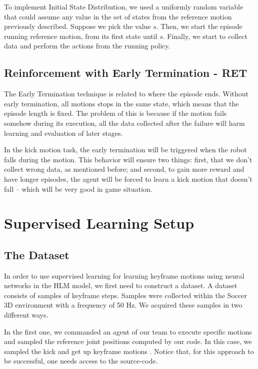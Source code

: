 To implement Initial State Distribution, we used a uniformly random variable that could assume any value in the set of states from the reference motion previously described. Suppose we pick the value $s$. Then, we start the episode running reference motion, from its first state until $s$. Finally, we start to collect data and perform the actions from the running policy.

\subsection{Reinforcement with Early Termination - RET}

The Early Termination technique is related to where the episode ends. Without early termination, all motions stops in the same state, which means that the episode length is fixed. The problem of this is because if the motion fails somehow during its execution, all the data collected after the failure will harm learning and evaluation of later stages.

In the kick motion task, the early termination will be triggered when the robot falls during the motion. This behavior will ensure two things: first, that we don't collect wrong data, as mentioned before; and second, to gain more reward and have longer episodes, the agent will be forced to learn a kick motion that doesn't fall -- which will be very good in game situation.



\section{Supervised Learning Setup}\label{supervised_learning_setup}
\subsection{The Dataset}\label{AA}
In order to use supervised learning for learning keyframe motions using neural networks in the HLM model, we first need to construct a dataset. A dataset consists of samples of keyframe steps. Samples were collected within the Soccer 3D environment with a frequency of 50 Hz. We acquired these samples in two different ways.

In the first one, we commanded an agent of our team to execute specific motions and sampled the reference joint positions computed by our code. In this case, we sampled the kick and get up keyframe motions \cite{muniz2016}. Notice that, for this approach to be successful, one needs access to the source-code.

